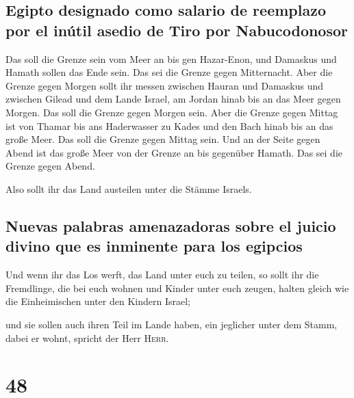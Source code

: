 \hypertarget{egipto-designado-como-salario-de-reemplazo-por-el-inuxfatil-asedio-de-tiro-por-nabucodonosor}{%
\subsection{Egipto designado como salario de reemplazo por el inútil
asedio de Tiro por
Nabucodonosor}\label{egipto-designado-como-salario-de-reemplazo-por-el-inuxfatil-asedio-de-tiro-por-nabucodonosor}}

 Das soll die Grenze sein vom Meer an bis gen Hazar-Enon,
und Damaskus und Hamath sollen das Ende sein. Das sei die Grenze gegen
Mitternacht.  Aber die Grenze gegen Morgen sollt ihr
messen zwischen Hauran und Damaskus und zwischen Gilead und dem Lande
Israel, am Jordan hinab bis an das Meer gegen Morgen. Das soll die
Grenze gegen Morgen sein.  Aber die Grenze gegen Mittag
ist von Thamar bis ans Haderwasser zu Kades und den Bach hinab bis an
das große Meer. Das soll die Grenze gegen Mittag sein. 
Und an der Seite gegen Abend ist das große Meer von der Grenze an bis
gegenüber Hamath. Das sei die Grenze gegen Abend.

 Also sollt ihr das Land austeilen unter die Stämme
Israels.

\hypertarget{nuevas-palabras-amenazadoras-sobre-el-juicio-divino-que-es-inminente-para-los-egipcios}{%
\subsection{Nuevas palabras amenazadoras sobre el juicio divino que es
inminente para los
egipcios}\label{nuevas-palabras-amenazadoras-sobre-el-juicio-divino-que-es-inminente-para-los-egipcios}}

 Und wenn ihr das Los werft, das Land unter euch zu
teilen, so sollt ihr die Fremdlinge, die bei euch wohnen und Kinder
unter euch zeugen, halten gleich wie die Einheimischen unter den Kindern
Israel;

 und sie sollen auch ihren Teil im Lande haben, ein
jeglicher unter dem Stamm, dabei er wohnt, spricht der Herr
\textsc{Herr}.

\hypertarget{section-47}{%
\section{48}\label{section-47}}

